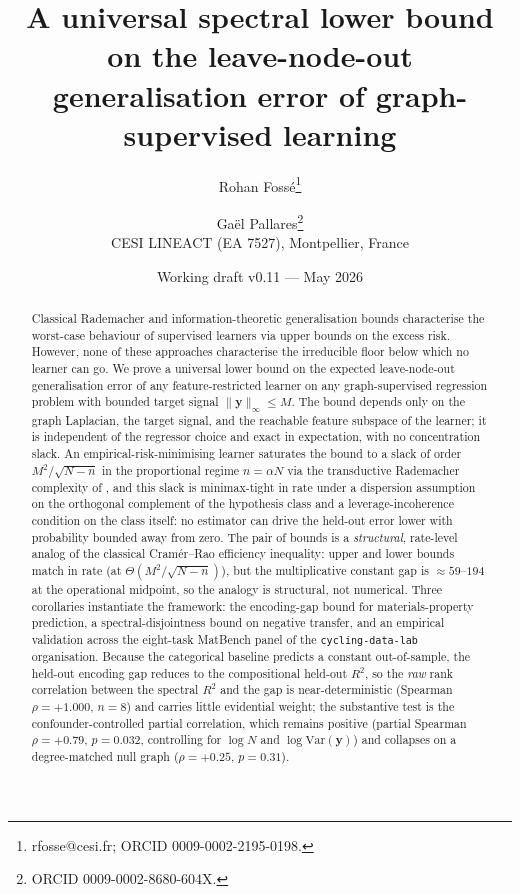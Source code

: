 \documentclass[11pt,a4paper]{article}
\title{A universal spectral lower bound on the leave-node-out
generalisation error of graph-supervised learning}
\author{Rohan Foss\'e\thanks{rfosse@cesi.fr; ORCID 0009-0002-2195-0198.}
\and Ga\"el Pallares\thanks{ORCID 0009-0002-8680-604X.}\\
\small CESI LINEACT (EA 7527), Montpellier, France}
\date{Working draft v0.11 --- May 2026}
\theoremstyle{plain}
\theoremstyle{definition}
\theoremstyle{remark}
\newcommand{\by}{\mathbf{y}}
\newcommand{\Var}{\mathrm{Var}}
\begin{document}
\maketitle

\begin{abstract}
Classical Rademacher and information-theoretic generalisation bounds
characterise the worst-case behaviour of supervised learners via upper
bounds on the excess risk.  However, none of these approaches
characterise the irreducible floor below which no learner can go.  We
prove a universal lower bound on the expected leave-node-out
generalisation error of any feature-restricted learner on any
graph-supervised regression problem with bounded target signal
$\|\by\|_\infty \le M$.  The bound depends only on the graph Laplacian,
the target signal, and the reachable feature subspace of the learner;
it is independent of the regressor choice and exact in expectation,
with no concentration slack.  An empirical-risk-minimising learner
saturates the bound to a slack of order $M^2/\sqrt{N - n}$ in the
proportional regime $n = \alpha N$ via the transductive Rademacher
complexity of \citet{ElYanivPechyony2006}, and this slack is
minimax-tight in rate under a dispersion assumption on the
orthogonal complement of the hypothesis class and a
leverage-incoherence condition on the class itself: no estimator
can drive the held-out error lower with probability bounded away
from zero.  The pair of bounds is a \emph{structural}, rate-level
analog of the classical Cram\'er--Rao efficiency inequality: upper
and lower bounds match in rate (at $\Theta(M^2/\sqrt{N-n})$), but the
multiplicative constant gap is $\approx 59$--$194$ at the operational
midpoint, so the analogy is structural, not numerical.  Three
corollaries instantiate the framework: the encoding-gap bound for
materials-property prediction, a spectral-disjointness bound on
negative transfer, and an empirical validation across the eight-task
MatBench panel of the \texttt{cycling-data-lab} organisation.  Because
the categorical baseline predicts a constant out-of-sample, the
held-out encoding gap reduces to the compositional held-out $R^2$, so
the \emph{raw} rank correlation between the spectral $R^2$ and the gap
is near-deterministic (Spearman $\rho = +1.000$, $n=8$) and carries
little evidential weight; the substantive test is the
confounder-controlled partial correlation, which remains positive
(partial Spearman $\rho = +0.79$, $p = 0.032$, controlling for
$\log N$ and $\log\Var(\by)$) and collapses on a degree-matched null
graph ($\rho = +0.25$, $p = 0.31$).
\end{abstract}
\end{document}
